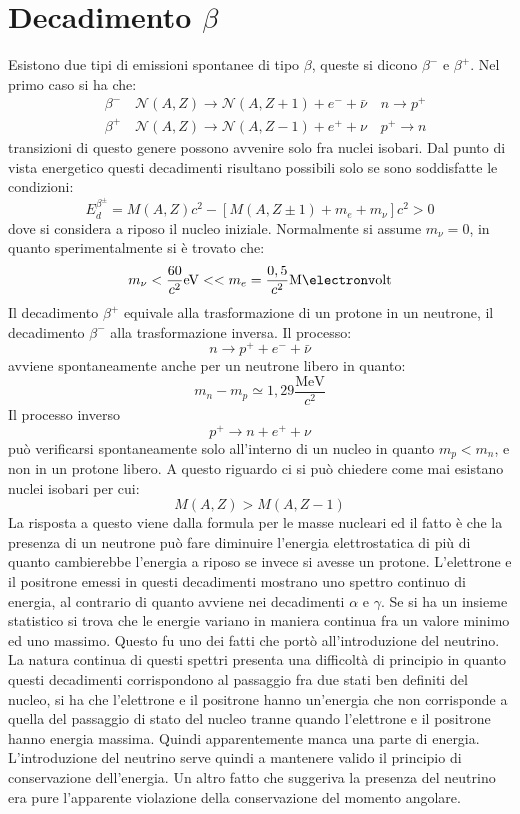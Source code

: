\section{Decadimento $\beta$}
Esistono due tipi di emissioni spontanee di tipo $\beta$, 
queste si dicono $\beta^-$ e $\beta^+$.
Nel primo caso si ha che:
\begin{align*}
&\beta^-\quad \mathcal{N}(A,Z)\rightarrow\mathcal{N}(A,Z+1)+e^-+\bar{\nu}\quad 
n\rightarrow p^+\\
&\beta^+\quad \mathcal{N}(A,Z)\rightarrow\mathcal{N}(A,Z-1)+e^++\nu\quad 
p^+\rightarrow n
\end{align*}
transizioni di questo genere possono avvenire solo fra nuclei isobari.
Dal punto di vista energetico questi decadimenti risultano possibili solo se 
sono soddisfatte le condizioni:
\[
E_d^{\beta^{\pm}}=M(A,Z)c^2-[M(A,Z\pm1)+m_e+m_{\nu}]c^2>0
\]
dove si considera a riposo il nucleo iniziale. Normalmente si assume 
$m_{\nu}=0$, in quanto sperimentalmente si è trovato che:
\[
m_{\nu}<\frac{60}{c^2}\si{\electronvolt}<<m_e=\frac{0,5}{c^2}\si{\mega\electronv
olt}
\]
Il decadimento $\beta^+$ equivale alla trasformazione di un protone in un 
neutrone, il decadimento $\beta^-$ alla trasformazione inversa.
Il processo:
\[
n\rightarrow p^++e^-+\bar{\nu}
\]
avviene spontaneamente anche per un neutrone libero in quanto:
\[
m_n-m_p\simeq1,29\frac{\si{\mega\electronvolt}}{c^2}
\]
Il processo inverso
\[
p^+\rightarrow n+e^++\nu
\]
può verificarsi spontaneamente solo all'interno di un nucleo in quanto 
$m_p<m_n$, e non in un protone libero. A questo riguardo ci si può chiedere
come mai esistano nuclei isobari per cui:
\[
M(A,Z)>M(A,Z-1)
\]
La risposta a questo viene dalla formula  per le masse nucleari ed il fatto è 
che la presenza di un neutrone può fare diminuire l'energia elettrostatica di 
più di
quanto cambierebbe l'energia a riposo se invece si avesse un protone. 
L'elettrone e il positrone emessi in questi decadimenti mostrano uno spettro 
continuo di energia,
al contrario di quanto avviene nei decadimenti $\alpha$ e $\gamma$. Se si ha un 
insieme statistico si trova che le energie variano in maniera continua fra un 
valore minimo
ed uno massimo. Questo fu uno dei fatti che portò all'introduzione del 
neutrino. La natura continua di questi spettri presenta una difficoltà di 
principio in quanto
questi decadimenti corrispondono al passaggio fra due stati ben definiti del 
nucleo, si ha che l'elettrone e il positrone hanno un'energia che non
corrisponde a quella del passaggio di stato del nucleo tranne quando 
l'elettrone e il positrone hanno energia massima.
Quindi apparentemente manca una parte di energia. L'introduzione del neutrino 
serve quindi a mantenere valido il principio di conservazione dell'energia.
Un altro fatto che suggeriva la presenza del neutrino era pure l'apparente 
violazione della conservazione del momento angolare.

